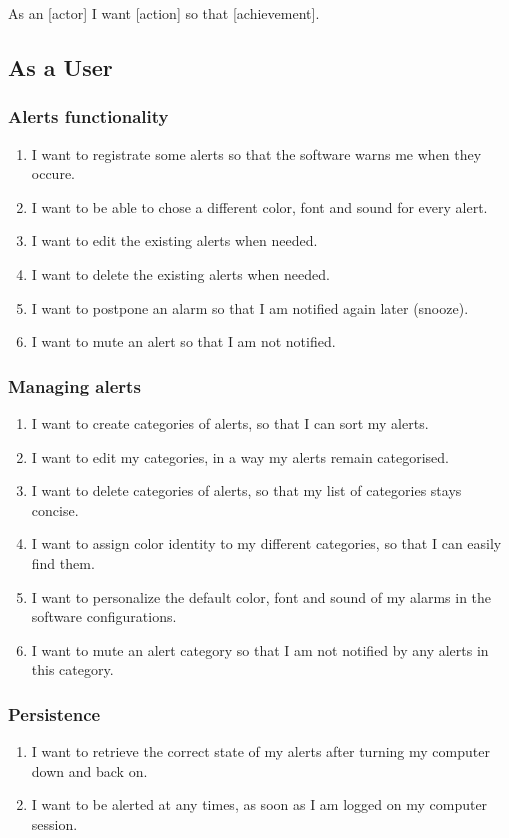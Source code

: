 As an [actor] I want [action] so that [achievement].

\subsection*{As a User}
\subsubsection{Alerts functionality}
\begin{enumerate}
	\item I want to registrate some alerts so that the software warns me when
        they occure.
	\item I want to be able to chose a different color, font and sound for every
        alert.
	\item I want to edit the existing alerts when needed.
	\item I want to delete the existing alerts when needed.
	\item I want to postpone an alarm so that I am notified again later
        (snooze).
	\item I want to mute an alert so that I am not notified.
	\setcounter{counter}{\value{enumi}}
\end{enumerate}
\subsubsection{Managing alerts}
\begin{enumerate}
	\setcounter{enumi}{\value{counter}}
	\item I want to create categories of alerts, so that I can sort my alerts.
	\item I want to edit my categories, in a way my alerts remain categorised.
	\item I want to delete categories of alerts, so that my list of categories
        stays concise.
	\item I want to assign color identity to my different categories, so that
        I can easily find them.
	\item I want to personalize the default color, font and sound of my alarms
        in the software configurations.
	\item I want to mute an alert category so that I am not notified by any
        alerts in this category.
	\setcounter{counter}{\value{enumi}}
\end{enumerate}
\subsubsection{Persistence}
\begin{enumerate}
	\setcounter{enumi}{\value{counter}}
	\item I want to retrieve the correct state of my alerts after turning my
        computer down and back on.
	\item I want to be alerted at any times, as soon as I am logged on my
        computer session.
	\setcounter{counter}{\value{enumi}}
\end{enumerate}
